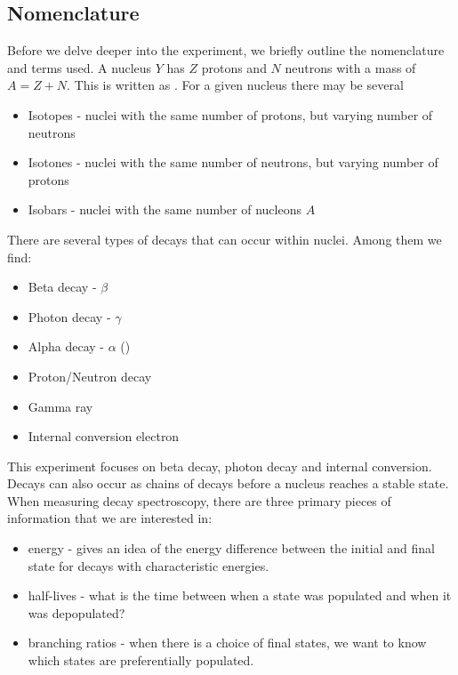 \subsection{Nomenclature}
Before we delve deeper into the experiment, we briefly outline the nomenclature
and terms used. A nucleus $Y$ has $Z$ protons and $N$ neutrons with a mass of $A = Z + N$.
This is written as . For a given nucleus there may be several
\begin{itemize}
	\item Isotopes - nuclei with the same number of protons, but varying number of neutrons
	\item Isotones - nuclei with the same number of neutrons, but varying number of protons
	\item Isobars - nuclei with the same number of nucleons $A$
\end{itemize}
There are several types of decays that can occur within nuclei. Among them
we find:
\begin{itemize}
	\item Beta decay - $\beta$
	\item Photon decay - $\gamma$
	\item Alpha decay - $\alpha$ ()
	\item Proton/Neutron decay
	\item Gamma ray
	\item Internal conversion electron
\end{itemize}
This experiment focuses on beta decay, photon decay and internal
conversion. Decays can also occur as chains of decays before a nucleus
reaches a stable state. When measuring decay spectroscopy, there are three
primary pieces of information that we are interested in:
\begin{itemize}
	\item energy - gives an idea of the energy difference between the initial
	and final state for decays with characteristic energies.
	\item half-lives - what is the time between when a state was populated
	and when it was depopulated?
	\item branching ratios - when there is a choice of final states, we want
	to know which states are preferentially populated.
\end{itemize}
